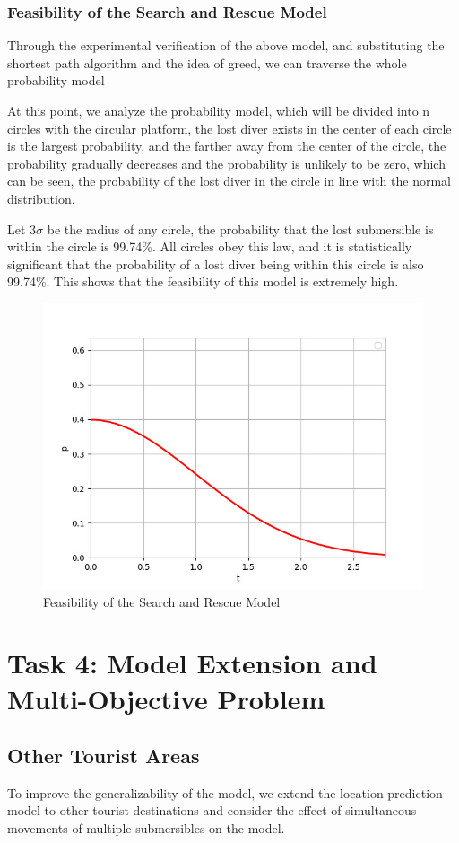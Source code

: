 \documentclass[12pt]{article}
\begin{document}
\subsubsection{Feasibility of the Search and Rescue Model}

Through the experimental verification of the above model, and substituting the shortest path algorithm and the idea of greed, we can traverse the whole probability model

At this point, we analyze the probability model, which will be divided into n circles with the circular platform, the lost diver exists in the center of each circle is the largest probability, and the farther away from the center of the circle, the probability gradually decreases and the probability is unlikely to be zero, which can be seen, the probability of the lost diver in the circle in line with the normal distribution.

Let $3σ$ be the radius of any circle, the probability that the lost submersible is within the circle is 99.74\%. All circles obey this law, and it is statistically significant that the probability of a lost diver being within this circle is also 99.74\%. This shows that the feasibility of this model is extremely high.

\begin{figure}
    \centering
    \includegraphics[width=.4\textwidth]{fig/possibility.jpg}
    \caption{Feasibility of the Search and Rescue Model}
    \label{fig:feasibility}
\end{figure}


\section{Task 4: Model Extension and Multi-Objective Problem}

\subsection{Other Tourist Areas}

To improve the generalizability of the model, we extend the location prediction model to other tourist destinations and consider the effect of simultaneous movements of multiple submersibles on the model.
\end{document}
